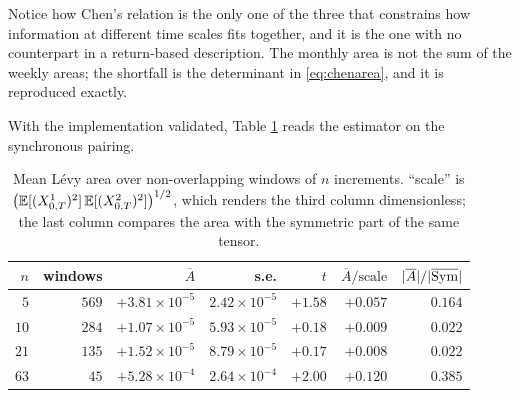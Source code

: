 

Notice how Chen's relation is the only one of the three that constrains how information at different
time scales fits together, and it is the one with no counterpart in a return-based description. The
monthly area is not the sum of the weekly areas; the shortfall is the determinant in
\eqref{eq:chenarea}, and it is reproduced exactly.


With the implementation validated, Table \ref{tab:levysync} reads the estimator on the synchronous
pairing.

\begin{table}[htbp]
\centering
\small
\begin{tabular}{rrrrrrr}
\hline
$n$ & windows & $\overline{A}$ & s.e. & $t$ & $\overline{A}/\text{scale}$ &
  $|\overline{A}|/|\overline{\operatorname{Sym}}|$\\
\hline
 $5$ & $569$ & $+3.81\times10^{-5}$ & $2.42\times10^{-5}$ & $+1.58$ & $+0.057$ & $0.164$\\
$10$ & $284$ & $+1.07\times10^{-5}$ & $5.93\times10^{-5}$ & $+0.18$ & $+0.009$ & $0.022$\\
$21$ & $135$ & $+1.52\times10^{-5}$ & $8.79\times10^{-5}$ & $+0.17$ & $+0.008$ & $0.022$\\
$63$ & $\;\;45$ & $+5.28\times10^{-4}$ & $2.64\times10^{-4}$ & $+2.00$ & $+0.120$ & $0.385$\\
\hline
\end{tabular}
\caption[Mean L\'evy area by window length]{Mean L\'evy area over non-overlapping windows of $n$ increments. ``scale'' is
$\bigl(\mathbb{E}[(X^{1}_{0,T})^{2}]\,\mathbb{E}[(X^{2}_{0,T})^{2}]\bigr)^{1/2}$, which renders the third
column dimensionless; the last column compares the area with the symmetric part of the same tensor.}
\label{tab:levysync}
\end{table}

